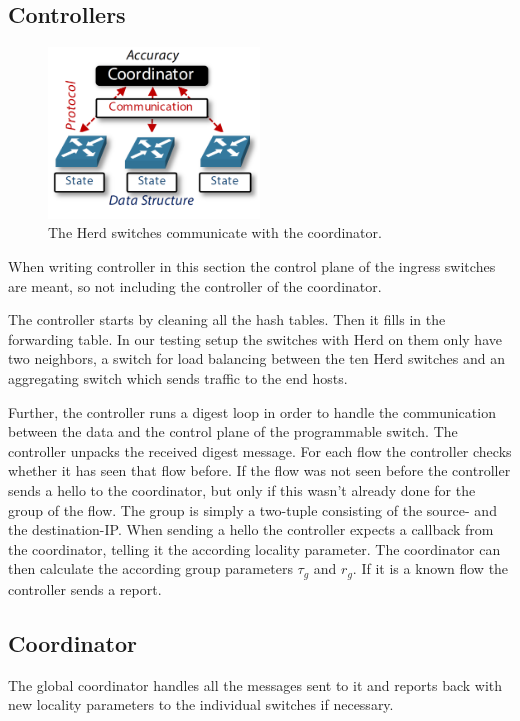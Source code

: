 \documentclass[11pt,oneside,a4paper]{article}
\begin{document}
\subsection{Controllers} \label{controller}

\begin{figure}
	\centering
	\includegraphics[width=0.5\textwidth,scale=1]{figures/global_local_paper}
	\caption{The Herd switches communicate with the coordinator. \cite{anon2019herd}}
	\label{fig:global_fig}
\end{figure}

When writing controller in this section the control plane of the ingress switches are meant, so not including the controller of the coordinator. 

The controller starts by cleaning all the hash tables. Then it fills in the forwarding table. In our testing setup the switches with Herd on them only have two neighbors, a switch for load balancing between the ten Herd switches and an aggregating switch which sends traffic to the end hosts.

Further, the controller runs a digest loop in order to handle the communication between the data and the control plane of the programmable switch. The controller unpacks the received digest message. For each flow the controller checks whether it has seen that flow before. If the flow was not seen before the controller sends a hello to the coordinator, but only if this wasn't already done for the group of the flow. The group is simply a two-tuple consisting of the source- and the destination-IP. When sending a hello the controller expects a callback from the coordinator, telling it the according locality parameter. The coordinator can then calculate the according group parameters $\tau_g$ and $r_g$. If it is a known flow the controller sends a report. %

\subsection{Coordinator} \label{coordinator}
The global coordinator handles all the messages sent to it and reports back with new locality parameters to the individual switches if necessary. 
\end{document}
